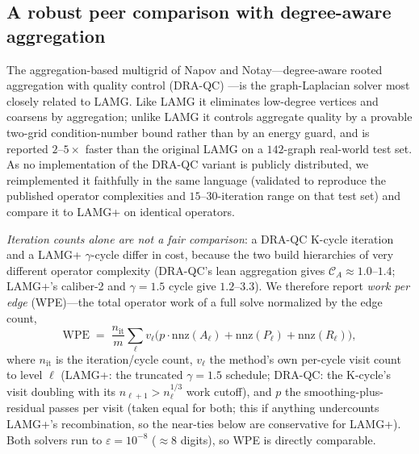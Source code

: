 \subsection{A robust peer comparison with degree-aware aggregation}\label{sec:draqc}

The aggregation-based multigrid of Napov and Notay---degree-aware rooted aggregation
with quality control (DRA-QC) \cite{napov-notay}---is the graph-Laplacian
solver most closely related to LAMG\@. Like LAMG it eliminates low-degree vertices and
coarsens by aggregation; unlike LAMG it controls aggregate quality by a provable two-grid
condition-number bound rather than by an energy guard, and is reported $2$--$5\times$ faster
than the original LAMG on a $142$-graph real-world test set. As no implementation of the
DRA-QC variant is publicly distributed, we reimplemented it faithfully in the same language
(validated to reproduce the published operator complexities and $15$--$30$-iteration range on
that test set) and compare it to LAMG+ on identical operators.

\emph{Iteration counts alone are not a fair comparison}: a DRA-QC K-cycle iteration and a
LAMG+ $\gamma$-cycle differ in cost, because the two build hierarchies of very different
operator complexity (DRA-QC's lean aggregation gives $\mathcal C_A\approx1.0$--$1.4$; LAMG+'s
caliber-2 and $\gamma{=}1.5$ cycle give $1.2$--$3.3$). We therefore report
\emph{work per edge} (WPE)---the total operator work of a full solve normalized by the edge
count,
\[
\mathrm{WPE}\;=\;\frac{n_{\mathrm{it}}}{m}\sum_{\ell} v_\ell\bigl(p\cdot\mathrm{nnz}(A_\ell)+\mathrm{nnz}(P_\ell)+\mathrm{nnz}(R_\ell)\bigr),
\]
where $n_{\mathrm{it}}$ is the iteration/cycle count, $v_\ell$ the method's own per-cycle visit
count to level $\ell$ (LAMG+: the truncated $\gamma{=}1.5$ schedule; DRA-QC: the K-cycle's
visit doubling with its $n_{\ell+1}>n_\ell^{1/3}$ work cutoff), and $p$ the smoothing-plus-residual
passes per visit (taken equal for both; this if anything undercounts LAMG+'s recombination, so
the near-ties below are conservative for LAMG+). Both solvers run to
$\varepsilon=10^{-8}$ ($\approx 8$ digits), so WPE is directly comparable.

